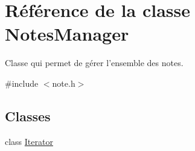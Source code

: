 \hypertarget{class_notes_manager}{\section{Référence de la classe Notes\-Manager}
\label{class_notes_manager}
}


Classe qui permet de gérer l'ensemble des notes.  




{\ttfamily \#include $<$note.\-h$>$}

\subsection*{Classes}
\begin{DoxyCompactItemize}
\item 
class \hyperlink{class_notes_manager_1_1_iterator}{Iterator}
\end{DoxyCompactItemize}
